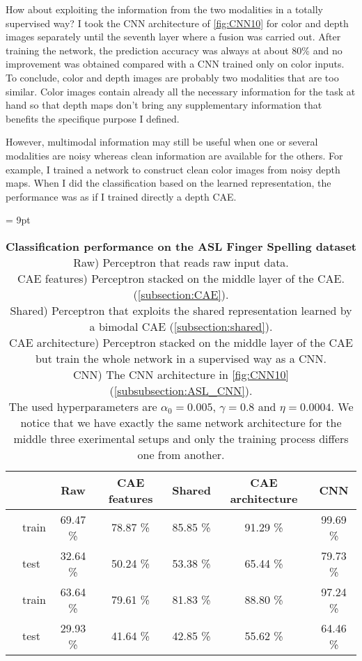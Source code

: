 How about exploiting the information from the two modalities in a
totally supervised way? I took the CNN architecture of \autoref{fig:CNN10}
for color and depth images separately until the seventh layer where
a fusion was carried out. After training the network, the prediction
accuracy was always at about 80\% and no improvement was obtained compared
with a CNN trained only on color inputs. To conclude, color and depth
images are probably two modalities that are too similar. Color images
contain already all the necessary information for the task at hand so
that depth maps don't bring any supplementary information that benefits
the specifique purpose I defined.

However, multimodal information may still be useful when one or several
modalities are noisy whereas clean information are available for the others.
For example, I trained a network to construct clean color images from
noisy depth maps. When I did the classification based on the learned
representation, the performance was as if I trained directly a depth CAE.

\begin{table}[H]
  \tabcolsep = 9pt
  \caption{\textbf{Classification performance on the ASL Finger Spelling
    dataset}\\[0.1em]
    Raw) Perceptron that reads raw input data.\\[0.1em]
    CAE features) Perceptron stacked on the middle layer of the CAE.
      (\ref{subsection:CAE}).\\[0.1em]
    Shared) Perceptron that exploits the shared representation learned
      by a bimodal CAE (\ref{subsection:shared}).\\[0.1em]
    CAE architecture) Perceptron stacked on the middle layer of the CAE
      but train the whole network in a supervised way as a CNN.\\[0.1em]
    CNN) The CNN architecture in \autoref{fig:CNN10}
      (\ref{subsubsection:ASL_CNN}). \\[0.1em]
    The used hyperparameters are $\alpha_0=0.005$, $\gamma=0.8$ and
    $\eta=0.0004$. We notice that we have exactly the same network
    architecture for the middle three exerimental setups and only the
    training process differs one from another.
    }
  \label{tab:ASL_classif}
  \begin{tabular*}{\linewidth}{>{\bf}llccccc}
    \toprule
    && Raw & CAE features & Shared & CAE architecture & CNN\\
    \midrule
    \multirow{2}{*}{Intensity} &
    train & 69.47 \% & 78.87 \% & 85.85 \% & 91.29 \% & 99.69 \% \\
    & test & 32.64 \% & 50.24 \% & 53.38 \% & 65.44 \% & 79.73 \% \\
    \midrule
    \multirow{2}{*}{Depth} &
    train & 63.64 \% & 79.61 \% & 81.83 \% & 88.80 \% & 97.24 \% \\
    & test & 29.93 \% & 41.64 \% & 42.85 \% & 55.62 \% & 64.46 \% \\
    \bottomrule
  \end{tabular*}
\end{table}


